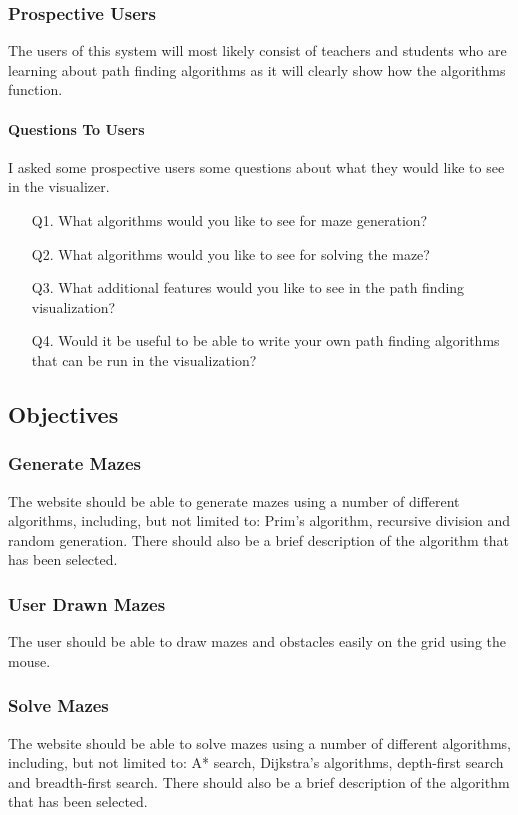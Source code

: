 \documentclass{article}
\begin{document}
\subsubsection{Prospective Users}
The users of this system will most likely consist of teachers and students who are learning about path finding algorithms as it will clearly show how the algorithms function.
\paragraph{Questions To Users}
I asked some prospective users some questions about what they would like to see in the visualizer.
\begin{enumerate}
    \item[Q1.]What algorithms would you like to see for maze generation?
    \item[Q2.]What algorithms would you like to see for solving the maze?
    \item[Q3.]What additional features would you like to see in the path finding visualization?
    \item[Q4.]Would it be useful to be able to write your own path finding algorithms that can be run in the visualization?  
\end{enumerate}
\subsection{Objectives}
\subsubsection{Generate Mazes}
The website should be able to generate mazes using a number of different algorithms, including, but not limited to: Prim's algorithm, recursive division and random generation. There should also be a brief description of the algorithm that has been selected.

\subsubsection{User Drawn Mazes}
The user should be able to draw mazes and obstacles easily on the grid using the mouse.

\subsubsection{Solve Mazes}
The website should be able to solve mazes using a number of different algorithms, including, but not limited to: A* search, Dijkstra's algorithms, depth-first search and breadth-first search. There should also be a brief description of the algorithm that has been selected.
\end{document}
